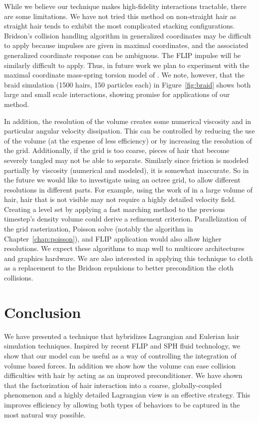 While we believe our technique makes high-fidelity interactions tractable, there
are some limitations.  We have not tried this method on non-straight hair as
straight hair tends to exhibit the most complicated stacking
configurations. Bridson's collision handling algorithm in
generalized coordinates may be difficult to apply because
impulses are given in maximal coordinates, and the associated generalized
coordinate response can be ambiguous. The FLIP impulse will be similarly
difficult to apply. Thus, in future work we plan to experiment with the maximal
coordinate mass-spring torsion model of \cite{selle:2008:hair}.
We note, however, that the braid simulation (1500 hairs, 150 particles
each) in Figure~\ref{fig:braid}
shows both large and small scale interactions, showing promise for applications
of our method.  

In addition, the resolution of the
volume creates some numerical viscosity and in particular angular velocity
dissipation. This can be controlled by reducing the use of the volume (at the
expense of less efficiency) or by increasing the resolution of the
grid. Additionally, if the grid is too coarse, pieces of hair that become
severely tangled may not be able to separate. Similarly since friction is
modeled partially by viscosity (numerical and modeled), it is somewhat
inaccurate. So in the future we would like to investigate using an octree grid,
to allow different resolutions in different parts. For example, using the work of
\cite{ward:2003:modeling-hair-lod} in a large volume of hair, hair that is not
visible may not require a highly detailed velocity field.  Creating a level set
by applying a fast marching method to the previous timestep's density volume
could derive a refinement criterion. Parallelization of the grid rasterization,
Poisson solve (notably the algorithm in Chapter~\ref{chap:poisson}), and FLIP application would 
also allow higher
resolutions.  We expect these algorithms to map well to multicore architectures and graphics 
hardware. 
We are also interested in applying this technique to cloth as a
replacement to the Bridson repulsions to better precondition the cloth
collisions.


\section{Conclusion}

We have presented a technique that hybridizes Lagrangian and Eulerian hair
simulation techniques. Inspired by recent FLIP and SPH fluid technology, we show
that our model can be useful as a way of controlling the integration of volume
based forces. In addition we show how the volume can ease collision difficulties
with hair by acting as an improved preconditioner. We have shown that the
factorization of hair interaction into a coarse, globally-coupled phenomenon and a
highly detailed Lagrangian view is an effective strategy.  This improves
efficiency by allowing both types of behaviors to be captured in the most
natural way possible. 



